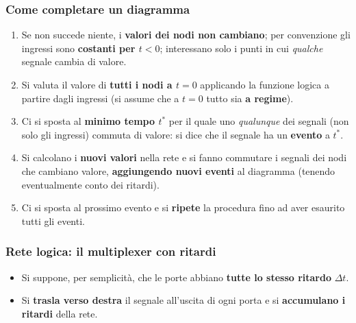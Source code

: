\documentclass[12pt, a4paper]{article}
\begin{document}
\subsubsection{Come completare un diagramma}

\begin{enumerate}
    \item Se non succede niente, i \textbf{valori dei nodi non cambiano}; per convenzione gli ingressi sono \textbf{costanti per $t < 0$}; interessano solo i punti in cui \emph{qualche} segnale cambia di valore.
    \item Si valuta il valore di \textbf{tutti i nodi a $t = 0$} applicando la funzione logica a partire dagli ingressi (si assume che a $t = 0$ tutto sia \textbf{a regime}).
    \item Ci si sposta al \textbf{minimo tempo $t^*$} per il quale uno \emph{qualunque} dei segnali (non solo gli ingressi) commuta di valore: si dice che il segnale ha un \textbf{evento} a $t^*$.
    \item Si calcolano i \textbf{nuovi valori} nella rete e si fanno commutare i segnali dei nodi che cambiano valore, \textbf{aggiungendo nuovi eventi} al diagramma (tenendo eventualmente conto dei ritardi).
    \item Ci si sposta al prossimo evento e si \textbf{ripete} la procedura fino ad aver esaurito tutti gli eventi.
\end{enumerate}

\subsubsection{Rete logica: il multiplexer con ritardi}

\begin{itemize}
    \item Si suppone, per semplicità, che le porte abbiano \textbf{tutte lo stesso ritardo} $\Delta t$.
    \item Si \textbf{trasla verso destra} il segnale all'uscita di ogni porta e si \textbf{accumulano i ritardi} della rete.
\end{itemize}
\end{document}
